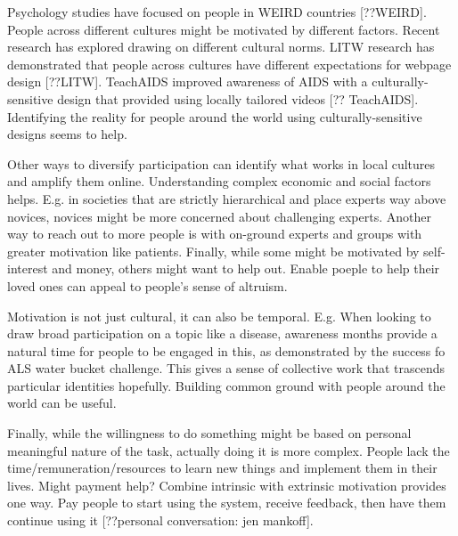 Psychology studies have focused on people in WEIRD countries [??WEIRD]. People across different cultures might be motivated by different factors. Recent research has explored drawing on different cultural norms. LITW research has demonstrated that people across cultures have different expectations for webpage design [??LITW]. TeachAIDS improved awareness of AIDS with a culturally-sensitive design that provided using locally tailored videos [?? TeachAIDS]. Identifying the reality for people around the world using culturally-sensitive designs seems to help. 

Other ways to diversify participation can identify what works in local cultures and amplify them online. Understanding complex economic and social factors helps. E.g. in societies that are strictly hierarchical and place experts way above novices, novices might be more concerned about challenging experts. Another way to reach out to more people is with on-ground experts and groups with greater motivation like patients. Finally, while some might be motivated by self-interest and money, others might want to help out. Enable poeple to help their loved ones can appeal to people's sense of altruism.

Motivation is not just cultural, it can also be temporal. E.g. When looking to draw broad participation on a topic like a disease, awareness months provide a natural time for people to be engaged in this, as demonstrated by the success fo ALS water bucket challenge. This gives a sense of collective work that trascends particular identities hopefully. Building common ground with people around the world can be useful.

Finally, while the willingness to do something might be based on personal meaningful nature of the task, actually doing it is more complex. People lack the time/remuneration/resources to learn new things and implement them in their lives. Might payment help? Combine intrinsic with extrinsic motivation provides one way. Pay people to start using the system, receive feedback, then have them continue using it [??personal conversation: jen mankoff]. 

